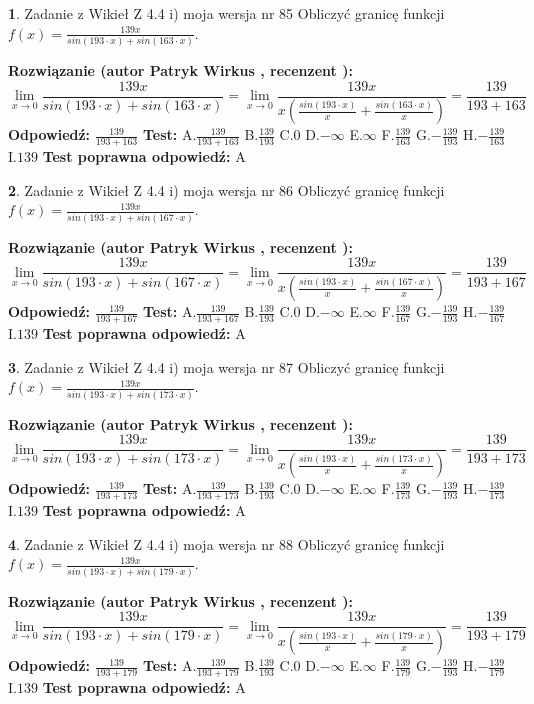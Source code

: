 \documentclass[12pt, a4paper]{article}
\theoremstyle{definition} %
\newtheorem{zad}{}
\newcommand{\zadStart}[1]{\begin{zad}#1\newline}
\newcommand{\zadStop}{\end{zad}}
\newcommand{\rozwStart}[2]{\noindent \textbf{Rozwiązanie (autor #1 , recenzent #2): }\newline}
\newcommand{\rozwStop}{\newline}
\newcommand{\odpStart}{\noindent \textbf{Odpowiedź:}\newline}
\newcommand{\odpStop}{\newline}
\newcommand{\testStart}{\noindent \textbf{Test:}\newline}
\newcommand{\testStop}{\newline}
\newcommand{\kluczStart}{\noindent \textbf{Test poprawna odpowiedź:}\newline}
\newcommand{\kluczStop}{\newline}
\begin{document}
\zadStart{Zadanie z Wikieł Z 4.4 i) moja wersja nr 85}
Obliczyć granicę funkcji $f(x)=\frac{139x}{sin(193\cdot x) +sin(163\cdot x)}$.
\zadStop
\rozwStart{Patryk Wirkus}{}
$$\lim\limits_{x\to 0}\frac{139x}{sin(193\cdot x) +sin(163\cdot x)}=\lim\limits_{x\to 0}\frac{139x}{x(\frac{sin(193\cdot x)}{x}+\frac{sin(163\cdot x)}{x})}=\frac{139}{193+163}$$
\rozwStop
\odpStart
$\frac{139}{193+163}$
\odpStop
\testStart
A.$\frac{139}{193+163}$
B.$\frac{139}{193}$
C.$0$
D.$-\infty$
E.$\infty$
F.$\frac{139}{163}$
G.$-\frac{139}{193}$
H.$-\frac{139}{163}$
I.$139$
\testStop
\kluczStart
A
\kluczStop



\zadStart{Zadanie z Wikieł Z 4.4 i) moja wersja nr 86}
Obliczyć granicę funkcji $f(x)=\frac{139x}{sin(193\cdot x) +sin(167\cdot x)}$.
\zadStop
\rozwStart{Patryk Wirkus}{}
$$\lim\limits_{x\to 0}\frac{139x}{sin(193\cdot x) +sin(167\cdot x)}=\lim\limits_{x\to 0}\frac{139x}{x(\frac{sin(193\cdot x)}{x}+\frac{sin(167\cdot x)}{x})}=\frac{139}{193+167}$$
\rozwStop
\odpStart
$\frac{139}{193+167}$
\odpStop
\testStart
A.$\frac{139}{193+167}$
B.$\frac{139}{193}$
C.$0$
D.$-\infty$
E.$\infty$
F.$\frac{139}{167}$
G.$-\frac{139}{193}$
H.$-\frac{139}{167}$
I.$139$
\testStop
\kluczStart
A
\kluczStop



\zadStart{Zadanie z Wikieł Z 4.4 i) moja wersja nr 87}
Obliczyć granicę funkcji $f(x)=\frac{139x}{sin(193\cdot x) +sin(173\cdot x)}$.
\zadStop
\rozwStart{Patryk Wirkus}{}
$$\lim\limits_{x\to 0}\frac{139x}{sin(193\cdot x) +sin(173\cdot x)}=\lim\limits_{x\to 0}\frac{139x}{x(\frac{sin(193\cdot x)}{x}+\frac{sin(173\cdot x)}{x})}=\frac{139}{193+173}$$
\rozwStop
\odpStart
$\frac{139}{193+173}$
\odpStop
\testStart
A.$\frac{139}{193+173}$
B.$\frac{139}{193}$
C.$0$
D.$-\infty$
E.$\infty$
F.$\frac{139}{173}$
G.$-\frac{139}{193}$
H.$-\frac{139}{173}$
I.$139$
\testStop
\kluczStart
A
\kluczStop



\zadStart{Zadanie z Wikieł Z 4.4 i) moja wersja nr 88}
Obliczyć granicę funkcji $f(x)=\frac{139x}{sin(193\cdot x) +sin(179\cdot x)}$.
\zadStop
\rozwStart{Patryk Wirkus}{}
$$\lim\limits_{x\to 0}\frac{139x}{sin(193\cdot x) +sin(179\cdot x)}=\lim\limits_{x\to 0}\frac{139x}{x(\frac{sin(193\cdot x)}{x}+\frac{sin(179\cdot x)}{x})}=\frac{139}{193+179}$$
\rozwStop
\odpStart
$\frac{139}{193+179}$
\odpStop
\testStart
A.$\frac{139}{193+179}$
B.$\frac{139}{193}$
C.$0$
D.$-\infty$
E.$\infty$
F.$\frac{139}{179}$
G.$-\frac{139}{193}$
H.$-\frac{139}{179}$
I.$139$
\testStop
\kluczStart
A
\kluczStop
\end{document}
